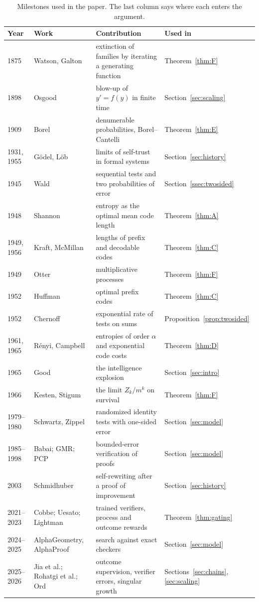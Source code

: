 \begin{table}[t]
\caption{Milestones used in the paper. The last column says where each enters the argument.}
\label{tab:history}
\centering
\small
\begin{tabular}{@{}l l p{} l@{}}
\toprule
Year & Work & Contribution & Used in \\
\midrule
1875 & Watson, Galton \cite{WG75} & extinction of families by iterating a generating function & Theorem~\ref{thm:F} \\
1898 & Osgood \cite{Osg98} & blow-up of $y'=f(y)$ in finite time & Section~\ref{sec:scaling} \\
1909 & Borel \cite{Bor09} & denumerable probabilities, Borel--Cantelli & Theorem~\ref{thm:E} \\
1931, 1955 & G\"odel, L\"ob \cite{God31,Lob55} & limits of self-trust in formal systems & Section~\ref{sec:history} \\
1945 & Wald \cite{Wal45} & sequential tests and two probabilities of error & Section~\ref{ssec:twosided} \\
1948 & Shannon \cite{Sha48} & entropy as the optimal mean code length & Theorem~\ref{thm:A} \\
1949, 1956 & Kraft, McMillan \cite{Kra49,McM56} & lengths of prefix and decodable codes & Theorem~\ref{thm:C} \\
1949 & Otter \cite{Ott49} & multiplicative processes & Theorem~\ref{thm:F} \\
1952 & Huffman \cite{Huf52} & optimal prefix codes & Theorem~\ref{thm:C} \\
1952 & Chernoff \cite{Che52} & exponential rate of tests on sums & Proposition~\ref{prop:twosided} \\
1961, 1965 & R\'enyi, Campbell \cite{Ren61,Cam65} & entropies of order $\alpha$ and exponential code costs & Theorem~\ref{thm:D} \\
1965 & Good \cite{Goo66} & the intelligence explosion & Section~\ref{sec:intro} \\
1966 & Kesten, Stigum \cite{KS66} & the limit $Z_{k}/m^{k}$ on survival & Theorem~\ref{thm:F} \\
1979--1980 & Schwartz, Zippel \cite{Sch80,Zip79} & randomized identity tests with one-sided error & Section~\ref{sec:model} \\
1985--1998 & Babai; GMR; PCP \cite{Bab85,GMR89,AS98,ALM98} & bounded-error verification of proofs & Section~\ref{sec:model} \\
2003 & Schmidhuber \cite{Sch03} & self-rewriting after a proof of improvement & Section~\ref{sec:history} \\
2021--2023 & Cobbe; Uesato; Lightman \cite{CKB21,UKK22,LKB23} & trained verifiers, process and outcome rewards & Theorem~\ref{thm:gating} \\
2024--2025 & AlphaGeometry, AlphaProof \cite{TWL24,HMS25} & search against exact checkers & Section~\ref{sec:model} \\
2025--2026 & Jia et al.; Rohatgi et al.; Ord \cite{JRX25,RSS25,Ord26} & outcome supervision, verifier errors, singular growth & Sections~\ref{sec:chains}, \ref{sec:scaling} \\
\bottomrule
\end{tabular}
\end{table}

